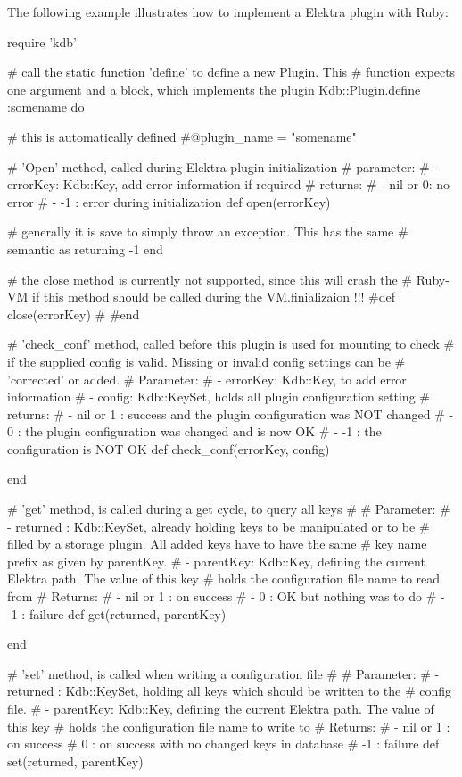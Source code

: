The following example illustrates how to implement a Elektra plugin with Ruby\+:


\begin{DoxyCode}
require 'kdb'

# call the static function 'define' to define a new Plugin. This
# function expects one argument and a block, which implements the plugin
Kdb::Plugin.define :somename do

  # this is automatically defined
  #@plugin\_name = "somename"


  # 'Open' method, called during Elektra plugin initialization
  # parameter:
  #  - errorKey: Kdb::Key, add error information if required
  # returns:
  #  - nil or 0: no error
  #  - -1      : error during initialization
  def open(errorKey)

    # generally it is save to simply throw an exception. This has the same
    # semantic as returning -1
  end

  # the close method is currently not supported, since this will crash the 
  # Ruby-VM if this method should be called during the VM.finializaion !!!
  #def close(errorKey)
  #
  #end


  # 'check\_conf' method, called before this plugin is used for mounting to check
  # if the supplied config is valid. Missing or invalid config settings can be
  # 'corrected' or added.
  # Parameter:
  #  - errorKey: Kdb::Key, to add error information
  #  - config: Kdb::KeySet, holds all plugin configuration setting
  # returns:
  #  - nil or 1 : success and the plugin configuration was NOT changed
  #  -        0 : the plugin configuration was changed and is now OK
  #  -       -1 : the configuration is NOT OK
  def check\_conf(errorKey, config)

  end


  # 'get' method, is called during a get cycle, to query all keys
  #
  # Parameter:
  #  - returned : Kdb::KeySet, already holding keys to be manipulated or to be
  #               filled by a storage plugin. All added keys have to have the same
  #               key name prefix as given by parentKey.
  #  - parentKey: Kdb::Key, defining the current Elektra path. The value of this key
  #               holds the configuration file name to read from
  # Returns:
  #  - nil or 1 : on success
  #  -        0 : OK but nothing was to do
  #  -       -1 : failure
  def get(returned, parentKey)

  end


  # 'set' method, is called when writing a configuration file
  #
  # Parameter:
  #  - returned : Kdb::KeySet, holding all keys which should be written to the
  #               config file.
  #  - parentKey: Kdb::Key, defining the current Elektra path. The value of this key
  #               holds the configuration file name to write to
  # Returns:
  #  - nil or 1 : on success
  #           0 : on success with no changed keys in database
  #          -1 : failure
  def set(returned, parentKey)


\end{DoxyCode}
